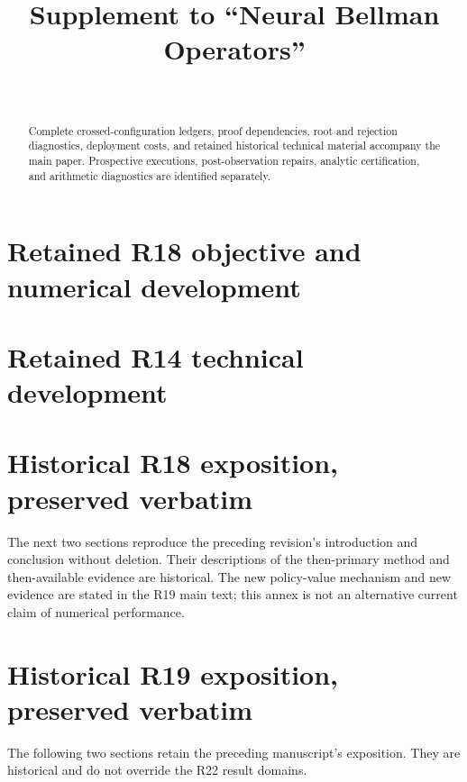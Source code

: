 \documentclass[ecta]{econsocart}
\theoremstyle{remark}
\begin{document}
\begin{frontmatter}
\title{Supplement to ``Neural Bellman Operators''}
\begin{aug}
\author[id=au1,addressref={add1}]{~}
\address[id=add1]{}
\end{aug}
\begin{abstract}Complete crossed-configuration ledgers, proof dependencies, root and rejection diagnostics, deployment costs, and retained historical technical material accompany the main paper. Prospective executions, post-observation repairs, analytic certification, and arithmetic diagnostics are identified separately.\end{abstract}
\end{frontmatter}




\section{Retained R18 objective and numerical development}


\section{Retained R14 technical development}

\clearpage
\section{Historical R18 exposition, preserved verbatim}
The next two sections reproduce the preceding revision's introduction and conclusion without deletion. Their descriptions of the then-primary method and then-available evidence are historical. The new policy-value mechanism and new evidence are stated in the R19 main text; this annex is not an alternative current claim of numerical performance.
\begingroup\let\historylabel\label\renewcommand{\label}[1]{\historylabel{historical-r18-#1}}


\endgroup
\clearpage
\section{Historical R19 exposition, preserved verbatim}
The following two sections retain the preceding manuscript's exposition. They are historical and do not override the R22 result domains.
\begingroup\let\historylabel\label\renewcommand{\label}[1]{\historylabel{historical-r19-#1}}


\endgroup
\clearpage
\end{document}
